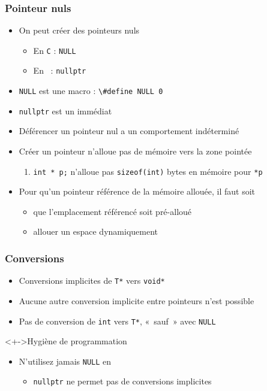 \begin{frame}
\frametitle{Pointeur nuls}
\begin{itemize}[<+->]
\item On peut créer des pointeurs nuls
	\begin{itemize}
	\item En \texttt{C} : \lstinline|NULL|
	\item En \cpp\ : \lstinline|nullptr|
	\end{itemize}
\item \lstinline|NULL| est une macro : \lstinline|\#define NULL 0|
\item \lstinline|nullptr| est un immédiat
\item Déférencer un pointeur nul a un comportement indéterminé
\item Créer un pointeur n'alloue pas de mémoire vers la zone pointée
	\begin{enumerate}
	\item \lstinline|int * p;| n'alloue pas \lstinline|sizeof(int)| bytes en mémoire pour \texttt{*p}
	\end{enumerate}
\item Pour qu'un pointeur référence de la mémoire allouée, il faut soit
	\begin{itemize}
	\item que l'emplacement référencé soit pré-alloué
	\item allouer un espace dynamiquement
	\end{itemize}
\end{itemize}
\end{frame}

\begin{frame}
\frametitle{Conversions}
\begin{itemize}[<+->]
\item Conversions implicites de \texttt{T*} vers \lstinline|void*|
\item Aucune autre conversion implicite entre pointeurs n'est possible
\item Pas de conversion de \lstinline|int| vers \texttt{T*}, «~sauf~» avec \lstinline|NULL|
\end{itemize}
\begin{block}<+->{Hygiène de programmation}
	\begin{itemize}[<+->]
	\item N'utilisez jamais \lstinline|NULL| en \cpp
		\begin{itemize}
		\item \lstinline|nullptr| ne permet pas de conversions implicites
		\end{itemize}
	\end{itemize}
\end{block}
\end{frame}

